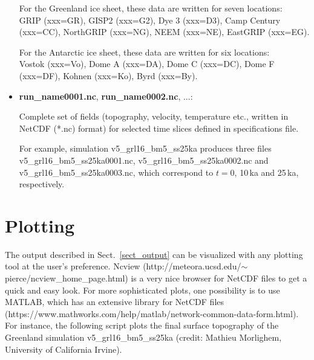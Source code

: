 \documentclass[12pt,a4paper]{article}
\begin{document}
\begin{itemize}
For the Greenland ice sheet, these data are written for seven locations:
\\
GRIP (xxx=GR), GISP2 (xxx=G2), Dye 3 (xxx=D3), Camp Century (xxx=CC), NorthGRIP (xxx=NG), NEEM (xxx=NE), EastGRIP (xxx=EG).

For the Antarctic ice sheet, these data are written for six locations:
\\
Vostok (xxx=Vo), Dome A (xxx=DA), Dome C (xxx=DC), Dome F (xxx=DF), Kohnen (xxx=Ko), Byrd (xxx=By).

\item \textbf{run\_name0001.nc}, \textbf{run\_name0002.nc}, ...:

Complete set of fields (topography, velocity, temperature etc., written in NetCDF (*.nc) format) for selected time slices defined in specifications file.

For example, simulation v5\_grl16\_bm5\_ss25ka produces three files v5\_grl16\_bm5\_\-ss25ka0001.nc, v5\_grl16\_bm5\_ss25ka0002.nc and v5\_grl16\_bm5\_ss25ka0003.nc, which correspond to $t=0$, 10\,ka and 25\,ka, respectively.

\end{itemize}



\section{Plotting}
\label{sect_plotting}

The output described in Sect.~\ref{sect_output} can be visualized with any plotting tool at the user's preference. Ncview (http://meteora.ucsd.edu/$\sim${}pierce/ncview\_home\_page.html) is a very nice browser for NetCDF files to get a quick and easy look. For more sophisticated plots, one possibility is to use MATLAB, which has an extensive library for NetCDF files (https://www.mathworks.com/help/matlab/network-common-data-form.html). For instance, the following script plots the final surface topography of the Greenland simulation v5\_grl16\_bm5\_ss25ka (credit: Mathieu Morlighem, University of California Irvine).

\vspace*{2ex}
\end{document}
